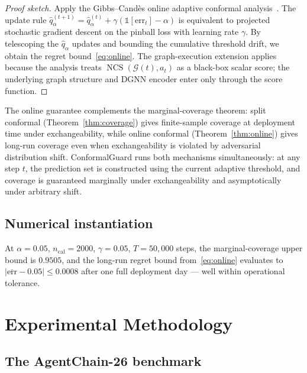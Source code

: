 \documentclass[12pt,a4paper]{article}
\theoremstyle{definition}
\theoremstyle{remark}
\newcommand{\modelname}{ConformalGuard}
\newcommand{\benchname}{AgentChain-26}
\newcommand{\Gcal}{\mathcal{G}}
\DeclareMathOperator{\NCS}{NCS}
\begin{document}
\begin{proof}[Proof sketch]
Apply the Gibbs--Cand\`es online adaptive conformal analysis~\cite{gibbs2021adaptive}. The update rule $\hat{q}_\alpha^{(t+1)} = \hat{q}_\alpha^{(t)} + \gamma(\mathbb{1}[\mathrm{err}_t] - \alpha)$ is equivalent to projected stochastic gradient descent on the pinball loss with learning rate $\gamma$. By telescoping the $\hat{q}_\alpha$ updates and bounding the cumulative threshold drift, we obtain the regret bound~\eqref{eq:online}. The graph-execution extension applies because the analysis treats $\NCS(\Gcal(t), a_t)$ as a black-box scalar score; the underlying graph structure and DGNN encoder enter only through the score function.
\end{proof}

The online guarantee complements the marginal-coverage theorem: split conformal (Theorem~\ref{thm:coverage}) gives finite-sample coverage at deployment time under exchangeability, while online conformal (Theorem~\ref{thm:online}) gives long-run coverage even when exchangeability is violated by adversarial distribution shift. \modelname{} runs both mechanisms simultaneously: at any step $t$, the prediction set is constructed using the current adaptive threshold, and coverage is guaranteed marginally under exchangeability and asymptotically under arbitrary shift.

\subsection{Numerical instantiation}

At $\alpha = 0.05$, $n_{\mathrm{cal}} = 2000$, $\gamma = 0.05$, $T = 50{,}000$ steps, the marginal-coverage upper bound is $0.9505$, and the long-run regret bound from~\eqref{eq:online} evaluates to $|\bar{\mathrm{err}} - 0.05| \leq 0.0008$ after one full deployment day --- well within operational tolerance.


\section{Experimental Methodology}
\label{sec:experiments}

\subsection{The \benchname{} benchmark}
\end{document}
